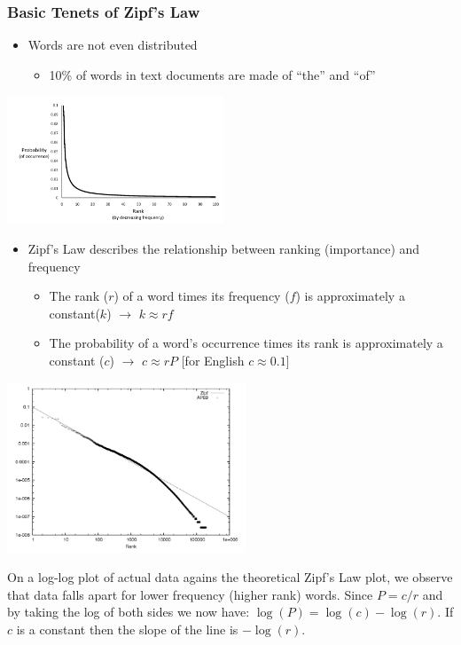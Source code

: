 \documentclass[handout,sanserif,mathserif]{beamer}
\begin{document}
\begin{frame}
\frametitle{Basic Tenets of Zipf's Law}

\begin{itemize}
\item Words are not even distributed
\begin{itemize}
\item 10\% of words in text documents are made of ``the'' and ``of''
\end{itemize}
\end{itemize}

\includegraphics[height=1.5in]{zipf-1.png}

\begin{itemize}
\item Zipf's Law describes the relationship between ranking (importance) and frequency
\begin{itemize}
\item The rank ($r$) of a word times its frequency ($f$) is approximately a constant($k$)  $\longrightarrow$  $k \approx r f $ 
\item The probability of a word's occurrence times its rank is approximately a constant ($c$)  $\longrightarrow$ $c \approx r P$ [for English $c \approx 0.1$]
\end{itemize}
\end{itemize}
\end{frame}


\begin{frame}
\includegraphics[height=2.0in]{zipf-2.png}

On a log-log plot of actual data agains the theoretical Zipf's Law plot, we observe that data falls apart for lower frequency (higher rank) words. Since $P = c/r$ and by taking the log of both sides we now have: $\log(P) = \log(c) - \log(r)$.  If $c$ is a constant then the slope of the line is $-\log(r)$.

\end{frame}
\end{document}
